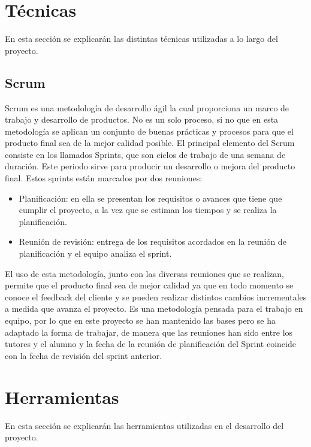 


\section{Técnicas}
En esta sección se explicarán las distintas técnicas utilizadas a lo largo del proyecto.

\subsection{Scrum}
Scrum es una metodología de desarrollo ágil la cual proporciona un marco de trabajo y desarrollo de productos. No es un solo proceso, si no que en esta metodología se aplican un conjunto de buenas prácticas y procesos para que el producto final sea de la mejor calidad posible.
El principal elemento del Scrum consiste en los llamados Sprints, que son ciclos de trabajo de una semana de duración. Este periodo sirve para producir un desarrollo o mejora del producto final. Estos sprints están marcados por dos reuniones:
\begin{itemize}
	\item Planificación: en ella se presentan los requisitos o avances que tiene que cumplir el proyecto, a la vez que se estiman los tiempos y se realiza la planificación.
	\item Reunión de revisión: entrega de los requisitos acordados en la reunión de planificación y el equipo analiza el sprint.
\end{itemize}
El uso de esta metodología, junto con las diversas reuniones que se realizan, permite que el producto final sea de mejor calidad ya que en todo momento se conoce el feedback del cliente y se pueden realizar distintos cambios incrementales a medida que avanza el proyecto.
Es una metodología pensada para el trabajo en equipo, por lo que en este proyecto se han mantenido las bases pero se ha adaptado la forma de trabajar, de manera que las reuniones han sido entre los tutores y el alumno y la fecha de la reunión de planificación del Sprint coincide con la fecha de revisión del sprint anterior.



\section{Herramientas}\label{herramientas}
En esta sección se explicarán las herramientas utilizadas en el desarrollo del proyecto.


